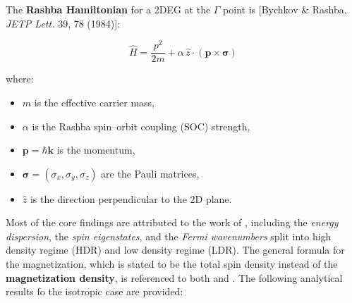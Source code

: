 \documentclass[
	fontsize = 11pt,
	paper = a4,
	draft = false,
	twoside = true,
	titlepage = false
]{scrartcl}
\numberwithin{equation}{subsection}
\begin{document}
	\begin{tcolorbox}[enhanced, breakable, title=The Extracted Rashba Hamiltonian as Stated in the Output,colback=blue!5!white, colframe=blue!75!black] \label{pma:hamilton}
		The \textbf{Rashba Hamiltonian} for a 2DEG at the $\Gamma$ point is [Bychkov \& Rashba, \textit{JETP Lett.} 39, 78 (1984)]:
		
		$$
		\boxed{\hat{H} = \frac{p^2}{2m} + \alpha\,\hat{z}\cdot(\mathbf{p}\times\boldsymbol{\sigma})}
		$$
		
		where:\begin{itemize}
			\item[-] $m$ is the effective carrier mass,
			\item[-] $\alpha$ is the Rashba spin–orbit coupling (SOC) strength,
			\item[-] $\mathbf{p} = \hbar\mathbf{k}$ is the momentum,
			\item[-] $\boldsymbol{\sigma}=(\sigma_x,\sigma_y,\sigma_z)$ are the Pauli matrices,
			\item[-] $\hat{z}$ is the direction perpendicular to the 2D plane.
		\end{itemize}
	\end{tcolorbox}
	Most of the core findings are attributed to the work of \citeauthor{paper1_Gaiardoni_2025} \autocite{paper1_Gaiardoni_2025}, including the \textit{energy dispersion}, the \textit{spin eigenstates}, and the \textit{Fermi wavenumbers} split into high density regime (HDR) and low density regime (LDR). The general formula for the magnetization, which is stated to be the total spin density instead of the \textbf{magnetization density}, is referenced to both \autocite{paper1_Gaiardoni_2025} and \autocite{paper2_Ezawa_2025}. The following analytical results fo the isotropic case are provided:
\end{document}
